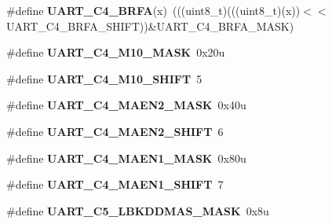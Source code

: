 \begin{DoxyCompactItemize}
\item 
\#define {\bfseries U\+A\+R\+T\+\_\+\+C4\+\_\+\+B\+R\+FA}(x)~(((uint8\+\_\+t)(((uint8\+\_\+t)(x))$<$$<$U\+A\+R\+T\+\_\+\+C4\+\_\+\+B\+R\+F\+A\+\_\+\+S\+H\+I\+FT))\&U\+A\+R\+T\+\_\+\+C4\+\_\+\+B\+R\+F\+A\+\_\+\+M\+A\+SK)\hypertarget{group__UART__Register__Masks_ga6f2c51a18bd4fe60b12fc2e68a18988b}{}\label{group__UART__Register__Masks_ga6f2c51a18bd4fe60b12fc2e68a18988b}

\item 
\#define {\bfseries U\+A\+R\+T\+\_\+\+C4\+\_\+\+M10\+\_\+\+M\+A\+SK}~0x20u\hypertarget{group__UART__Register__Masks_ga9e9d5093d6aec7bd4c3f418ee54f8801}{}\label{group__UART__Register__Masks_ga9e9d5093d6aec7bd4c3f418ee54f8801}

\item 
\#define {\bfseries U\+A\+R\+T\+\_\+\+C4\+\_\+\+M10\+\_\+\+S\+H\+I\+FT}~5\hypertarget{group__UART__Register__Masks_gafd4cf70aa0988a96e3744eae7a0f036d}{}\label{group__UART__Register__Masks_gafd4cf70aa0988a96e3744eae7a0f036d}

\item 
\#define {\bfseries U\+A\+R\+T\+\_\+\+C4\+\_\+\+M\+A\+E\+N2\+\_\+\+M\+A\+SK}~0x40u\hypertarget{group__UART__Register__Masks_gac1c8fa0730a887b5d4d43f426b27c955}{}\label{group__UART__Register__Masks_gac1c8fa0730a887b5d4d43f426b27c955}

\item 
\#define {\bfseries U\+A\+R\+T\+\_\+\+C4\+\_\+\+M\+A\+E\+N2\+\_\+\+S\+H\+I\+FT}~6\hypertarget{group__UART__Register__Masks_ga5ec71022d0264fefd4c63118d90adbb2}{}\label{group__UART__Register__Masks_ga5ec71022d0264fefd4c63118d90adbb2}

\item 
\#define {\bfseries U\+A\+R\+T\+\_\+\+C4\+\_\+\+M\+A\+E\+N1\+\_\+\+M\+A\+SK}~0x80u\hypertarget{group__UART__Register__Masks_gaa345d5da303c56b2881394dc0e003337}{}\label{group__UART__Register__Masks_gaa345d5da303c56b2881394dc0e003337}

\item 
\#define {\bfseries U\+A\+R\+T\+\_\+\+C4\+\_\+\+M\+A\+E\+N1\+\_\+\+S\+H\+I\+FT}~7\hypertarget{group__UART__Register__Masks_ga28655a6deae1adc48798c91db8ce24e1}{}\label{group__UART__Register__Masks_ga28655a6deae1adc48798c91db8ce24e1}

\item 
\#define {\bfseries U\+A\+R\+T\+\_\+\+C5\+\_\+\+L\+B\+K\+D\+D\+M\+A\+S\+\_\+\+M\+A\+SK}~0x8u\hypertarget{group__UART__Register__Masks_gad49b1674b1fa3e8be3e00d6499926d0e}{}\label{group__UART__Register__Masks_gad49b1674b1fa3e8be3e00d6499926d0e}


\end{DoxyCompactItemize}
